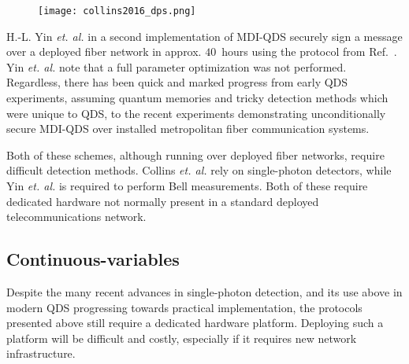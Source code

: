 \begin{figure}[htp]
\centering
\texttt{[image: collins2016\_dps.png]}
\caption{\label{fig:collins2016_dps}}
\end{figure}


H.-L. Yin \emph{et. al.} in a second implementation of MDI-QDS \cite{Yin2017} securely sign a message over a deployed fiber network in approx. $40$~hours using the protocol from Ref.~\cite{Puthoor2016}. Yin \emph{et. al.} note that a full parameter optimization was not performed. Regardless, there has been quick and marked progress from early QDS experiments, assuming quantum memories and tricky detection methods which were unique to QDS, to the recent experiments demonstrating unconditionally secure MDI-QDS over installed metropolitan fiber communication systems.

Both of these schemes, although running over deployed fiber networks, require difficult detection methods. Collins \emph{et. al.} \cite{Collings2016} rely on single-photon detectors, while Yin \emph{et. al.} \cite{Yin2017} is required to perform Bell measurements. Both of these require dedicated hardware not normally present in a standard deployed telecommunications network.









\subsection{Continuous-variables}

Despite the many recent advances in single-photon detection, and its use above in modern QDS progressing towards practical implementation, the protocols presented above still require a dedicated hardware platform. Deploying such a platform will be difficult and costly, especially if it requires new network infrastructure.

